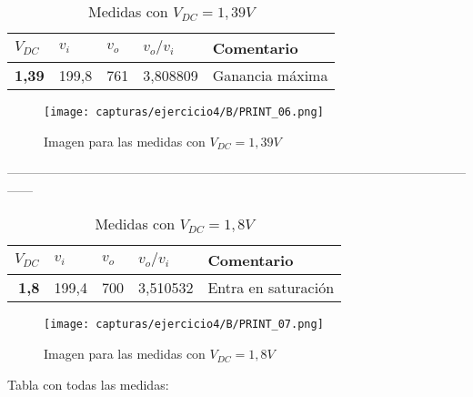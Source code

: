 \begin{table}[H]
	\centering
	\caption{Medidas con $ V_{DC} = 1,39 V $}
	\begin{tabular}{rrrrl}
		\multicolumn{1}{l}{\textbf{$ V_{DC} $}} & \multicolumn{1}{l}{\textbf{$ v_{i} $}} & \multicolumn{1}{l}{\textbf{$ v_{o} $}} & \multicolumn{1}{l}{\textbf{$ v_{o}/v_{i} $}} & \textbf{Comentario} \\
		\midrule
		\textbf{1,39}  & 199,8 & 761   & 3,808809 & Ganancia máxima 
		\\
	\end{tabular}%
	\label{tab:p4b3}%
\end{table}%
\vspace{-20pt}
\begin{figure}[H] %
	\centering
	\texttt{[image: capturas/ejercicio4/B/PRINT\_06.png]} 
	\caption{Imagen para las medidas con $ V_{DC} = 1,39 V $}
	\label{fig:practica4-b-5}
\end{figure}
\vspace{-20pt}
------------------------------------------------------------------------------------------------------------------
\vspace{-15pt}
\begin{table}[H]
	\centering
	\caption{Medidas con $ V_{DC} = 1,8 V $}
	\begin{tabular}{rrrrl}
		\multicolumn{1}{l}{\textbf{$ V_{DC} $}} & \multicolumn{1}{l}{\textbf{$ v_{i} $}} & \multicolumn{1}{l}{\textbf{$ v_{o} $}} & \multicolumn{1}{l}{\textbf{$ v_{o}/v_{i} $}} & \textbf{Comentario} \\
		\midrule
		\textbf{1,8}   & 199,4 & 700   & 3,510532 & Entra en saturación \\
	\end{tabular}%
	\label{tab:p4b4}%
\end{table}%
\vspace{-20pt}
\begin{figure}[H] %
	\centering
	\texttt{[image: capturas/ejercicio4/B/PRINT\_07.png]} 
	\caption{Imagen para las medidas con $ V_{DC} = 1,8 V $}
	\label{fig:practica4-b-6}
\end{figure}

\newpage
Tabla con todas las medidas:

